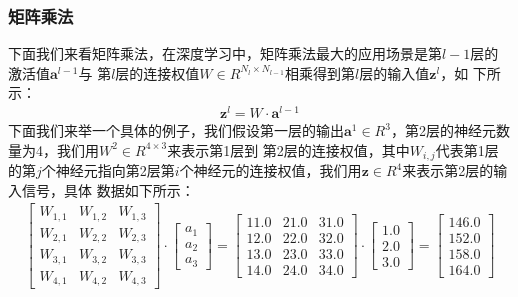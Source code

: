 \subsubsection{矩阵乘法}
下面我们来看矩阵乘法，在深度学习中，矩阵乘法最大的应用场景是第$l-1$层的激活值$\boldsymbol{a}^{l-1}$与
第$l$层的连接权值$W \in R^{N_{l} \times N_{l-1}}$相乘得到第$l$层的输入值$\boldsymbol{z}^{l}$，如
下所示：
\begin{equation}
\begin{aligned}
\boldsymbol{z}^{l} = W \cdot \boldsymbol{a}^{l-1}
\end{aligned}
\label{chpZ01-zwx-formula}
\end{equation}
下面我们来举一个具体的例子，我们假设第一层的输出$\boldsymbol{a}^{1} \in R^{3}$，第2层的神经元数量为4，我们用$W^{2} \in R^{4 \times 3}$来表示第1层到
第2层的连接权值，其中$W_{i,j}$代表第1层的第$j$个神经元指向第2层第$i$个神经元的连接权值，我们用$\boldsymbol{z} \in R^{4}$来表示第2层的输入信号，具体
数据如下所示：
\begin{equation}
\begin{aligned}
\begin{bmatrix}
	W_{1,1} & W_{1, 2} & W_{1,3} \\
	W_{2,1} & W_{2, 2} & W_{2,3} \\
	W_{3,1} & W_{3, 2} & W_{3,3} \\
	W_{4,1} & W_{4, 2} & W_{4,3} 
\end{bmatrix} \cdot \begin{bmatrix}
	a_{1} \\
	a_{2} \\
	a_{3}
\end{bmatrix} = \begin{bmatrix}
	11.0 & 21.0 & 31.0 \\
	12.0 & 22.0 & 32.0 \\
	13.0 & 23.0 & 33.0 \\
	14.0 & 24.0 & 34.0 
\end{bmatrix} \cdot \begin{bmatrix}
	1.0 \\
	2.0 \\
	3.0
\end{bmatrix} = \begin{bmatrix}
	146.0 \\
	152.0 \\
	158.0 \\
	164.0
\end{bmatrix}
\end{aligned}
\label{chpZ01-zwx-example}
\end{equation}
